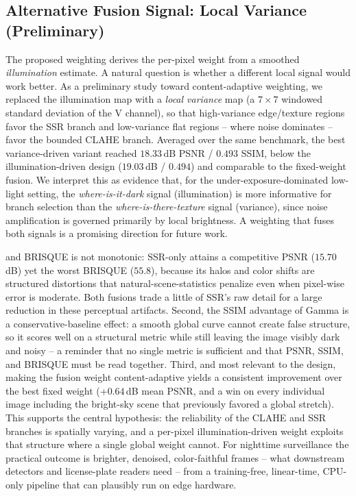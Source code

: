 \documentclass[conference,a4paper]{IEEEtran}
\begin{document}
\subsection{Alternative Fusion Signal: Local Variance (Preliminary)}
The proposed weighting derives the per-pixel weight from a smoothed
\emph{illumination} estimate. A natural question is whether a different local
signal would work better. As a preliminary study toward content-adaptive
weighting, we replaced the illumination map with a \emph{local variance} map
(a $7\times7$ windowed standard deviation of the V channel), so that
high-variance edge/texture regions favor the SSR branch and low-variance flat
regions -- where noise dominates -- favor the bounded CLAHE branch. Averaged
over the same benchmark, the best variance-driven variant reached
$18.33$\,dB PSNR / $0.493$ SSIM, below the illumination-driven design
($19.03$\,dB / $0.494$) and comparable to the fixed-weight fusion. We interpret
this as evidence that, for the under-exposure-dominated low-light setting, the
\emph{where-is-it-dark} signal (illumination) is more informative for branch
selection than the \emph{where-is-there-texture} signal (variance), since noise
amplification is governed primarily by local brightness. A weighting that fuses
both signals is a promising direction for future work.


and BRISQUE is not monotonic: SSR-only attains a competitive PSNR ($15.70$\,dB)
yet the worst BRISQUE ($55.8$), because its halos and color shifts are
structured distortions that natural-scene-statistics penalize even when
pixel-wise error is moderate. Both fusions trade a little of SSR's raw detail
for a large reduction in these perceptual artifacts. Second, the SSIM advantage
of Gamma is a conservative-baseline effect: a smooth global curve cannot create
false structure, so it scores well on a structural metric while still leaving
the image visibly dark and noisy -- a reminder that no single metric is
sufficient and that PSNR, SSIM, and BRISQUE must be read together. Third, and
most relevant to the design, making the fusion weight content-adaptive yields a
consistent improvement over the best fixed weight (+$0.64$\,dB mean PSNR, and a
win on every individual image including the bright-sky scene that previously
favored a global stretch). This supports the central hypothesis: the
reliability of the CLAHE and SSR branches is spatially varying, and a per-pixel
illumination-driven weight exploits that structure where a single global weight
cannot. For nighttime surveillance the practical outcome is brighter, denoised,
color-faithful frames -- what downstream detectors and license-plate readers
need -- from a training-free, linear-time, CPU-only pipeline that can plausibly
run on edge hardware.
\end{document}
